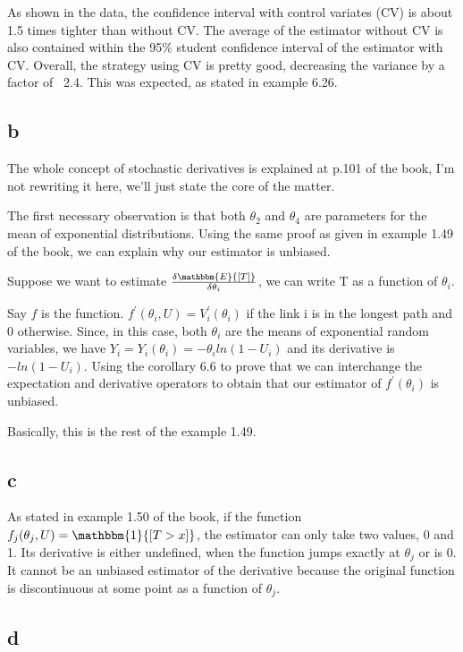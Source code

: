 \documentclass[12pt]{report}
\begin{document}
As shown in the data, the confidence interval with control variates (CV) is about 1.5 times tighter than without CV. The average of the estimator without CV is also contained within the 95\% student confidence interval of the estimator with CV. Overall, the strategy using CV is pretty good, decreasing the variance by a factor of ~2.4. This was expected, as stated in example 6.26.

\subsection*{b}

The whole concept of stochastic derivatives is explained at p.101 of the book, I'm not rewriting it here, we'll just state the core of the matter.

The first necessary observation is that both $\theta_2$ and $\theta_4$ are parameters for the mean of exponential distributions. Using the same proof as given in example 1.49 of the book, we can explain why our estimator is unbiased.

Suppose we want to estimate $\frac{\delta\mathbbm{E}{[T]}}{\delta \theta_i}$, we can write T as a function of $\theta_i$. 

Say $f$ is the function. $f^{'}(\theta_i, U) = V^{'}_i(\theta_i)$ if the link i is in the longest path and 0 otherwise.
Since, in this case, both $\theta_i$ are the means of exponential random variables, we have $Y_i = Y_i(\theta_i) = -\theta_i ln(1 - U_i)$ and its derivative is $-ln(1-U_i)$. Using the corollary 6.6 to prove that we can interchange the expectation and derivative operators to obtain that our estimator of $f^{'}(\theta_i)$ is unbiased.

Basically, this is the rest of the example 1.49.

\subsection*{c}

As stated in example 1.50 of the book, if the function $f_j(\theta_j, U) = \mathbbm{1}{[T > x]}$, the estimator can only take
two values, 0 and 1. Its derivative is either undefined, when the
function jumps exactly at $\theta_j$ or is 0. It cannot be an unbiased estimator of the derivative because the original function is discontinuous at some point as a function of $\theta_j$.

\subsection*{d}
\end{document}
